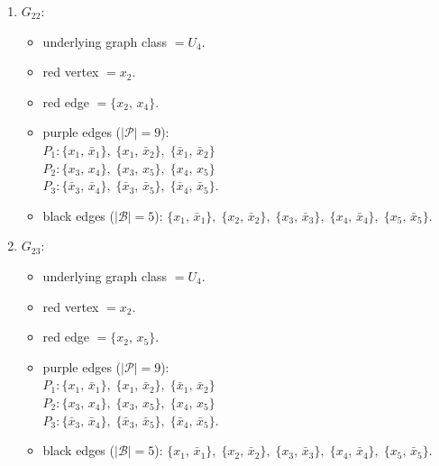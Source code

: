 \begin{enumerate}[leftmargin=*]
\begin{itemize}[leftmargin=*]
$P_{2}: \{x_{2},\,x_{4}\},\; \{x_{2},\,x_{5}\},\; \{x_{4},\,x_{5}\}$\\
$P_{3}: \{x_{3},\,\bar{x}_{3}\},\; \{x_{3},\,\bar{x}_{4}\},\; \{\bar{x}_{3},\,\bar{x}_{4}\}$.
\item black edges ($|\mathcal{B}|=5$): $\{x_{1},\,\bar{x}_{1}\},\; \{x_{2},\,\bar{x}_{2}\},\; \{x_{3},\,\bar{x}_{3}\},\; \{x_{4},\,\bar{x}_{4}\},\; \{x_{5},\,\bar{x}_{5}\}$.
\end{itemize}
\item $G_{22}$:
\begin{itemize}[leftmargin=*]
\item underlying graph class $= U_4$.
\item red vertex $= x_{2}$.
\item red edge $= \{x_{2},\,x_{4}\}$.
\item purple edges ($|\mathcal{P}|=9$):\mbox{}\\
$P_{1}: \{x_{1},\,\bar{x}_{1}\},\; \{x_{1},\,\bar{x}_{2}\},\; \{\bar{x}_{1},\,\bar{x}_{2}\}$\\
$P_{2}: \{x_{3},\,x_{4}\},\; \{x_{3},\,x_{5}\},\; \{x_{4},\,x_{5}\}$\\
$P_{3}: \{\bar{x}_{3},\,\bar{x}_{4}\},\; \{\bar{x}_{3},\,\bar{x}_{5}\},\; \{\bar{x}_{4},\,\bar{x}_{5}\}$.
\item black edges ($|\mathcal{B}|=5$): $\{x_{1},\,\bar{x}_{1}\},\; \{x_{2},\,\bar{x}_{2}\},\; \{x_{3},\,\bar{x}_{3}\},\; \{x_{4},\,\bar{x}_{4}\},\; \{x_{5},\,\bar{x}_{5}\}$.
\end{itemize}
\item $G_{23}$:
\begin{itemize}[leftmargin=*]
\item underlying graph class $= U_4$.
\item red vertex $= x_{2}$.
\item red edge $= \{x_{2},\,x_{5}\}$.
\item purple edges ($|\mathcal{P}|=9$):\mbox{}\\
$P_{1}: \{x_{1},\,\bar{x}_{1}\},\; \{x_{1},\,\bar{x}_{2}\},\; \{\bar{x}_{1},\,\bar{x}_{2}\}$\\
$P_{2}: \{x_{3},\,x_{4}\},\; \{x_{3},\,x_{5}\},\; \{x_{4},\,x_{5}\}$\\
$P_{3}: \{\bar{x}_{3},\,\bar{x}_{4}\},\; \{\bar{x}_{3},\,\bar{x}_{5}\},\; \{\bar{x}_{4},\,\bar{x}_{5}\}$.
\item black edges ($|\mathcal{B}|=5$): $\{x_{1},\,\bar{x}_{1}\},\; \{x_{2},\,\bar{x}_{2}\},\; \{x_{3},\,\bar{x}_{3}\},\; \{x_{4},\,\bar{x}_{4}\},\; \{x_{5},\,\bar{x}_{5}\}$.

\end{itemize}
\end{enumerate}
